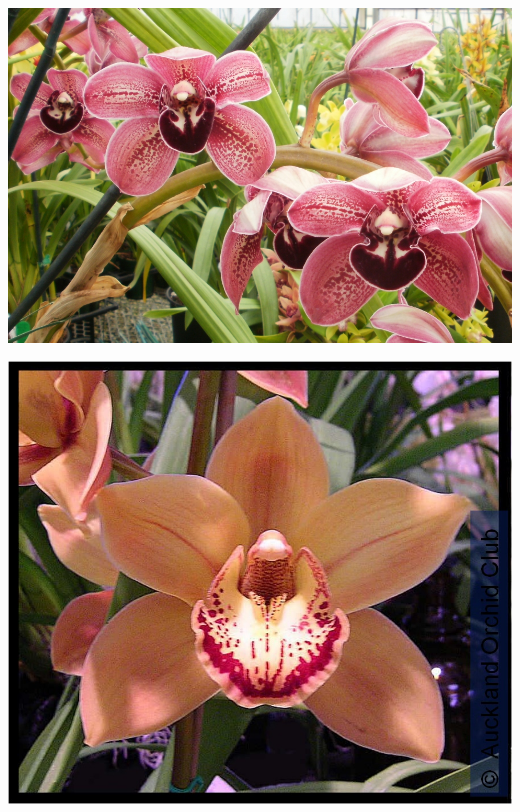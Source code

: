 \documentclass{article}
\begin{document}
\begin{center}
\includegraphics[height=0.925\paperheight]{../Cymbidium.jpg}
\end{center}
\newpage

\begin{center}
\includegraphics[height=0.925\paperheight]{../Cymbidium2.jpg}
\end{center}
\newpage
\end{document}
